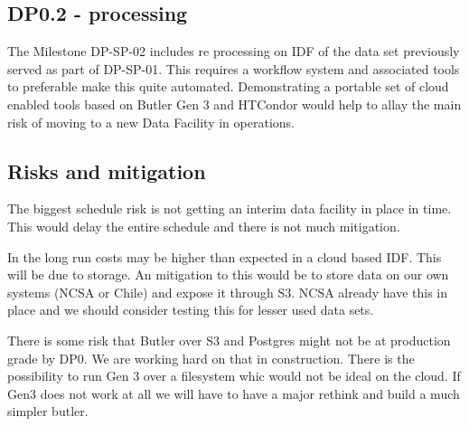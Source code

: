 \subsection{DP0.2 - processing}

The Milestone DP-SP-02 includes re processing on IDF of the data set previously served as part of DP-SP-01.
This requires a workflow system and associated tools to preferable make this quite automated.
Demonstrating a portable set of cloud enabled tools based on Butler Gen 3 and HTCondor would help to allay the main risk of moving to a new Data Facility in operations.

\subsection{Risks and mitigation}

The biggest schedule risk is not getting an interim data facility in place in time.
This would delay the entire schedule and there is not much mitigation.

In the long run costs may be higher than expected in a cloud based IDF. This will be due to storage.
An mitigation to this would be to store data on our own systems (NCSA or Chile) and expose it through S3.
NCSA already have this in place and we should consider testing this for lesser used data sets.

There is some risk that  Butler over S3 and Postgres  might not be at  production grade by DP0. We are working hard on that in construction. There is the possibility to run Gen 3 over a filesystem whic would not be ideal on the cloud. If Gen3 does not work at all we will have to have a major rethink and build a much simpler butler.
